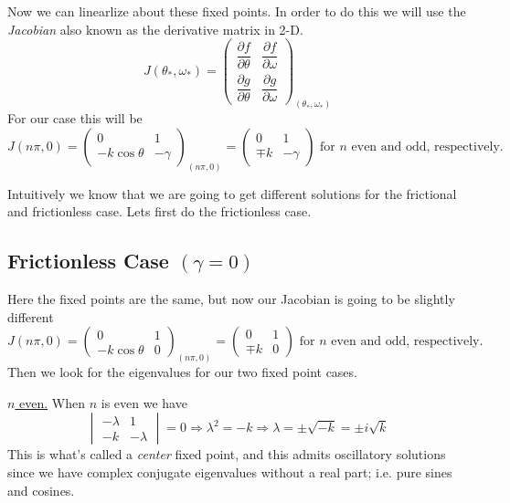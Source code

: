 \documentclass[reqno]{amsart}
\theoremstyle{definition}
\begin{document}
%
Now we can linearlize about these fixed points.  In order to do this we will use the \emph{Jacobian}
also known as the derivative matrix in 2-D.
%
\begin{equation}
J(\theta_*,\omega_*) = \begin{pmatrix}
\dfrac{\partial f}{\partial\theta} & \dfrac{\partial f}{\partial \omega}\\
\dfrac{\partial g}{\partial \theta} & \dfrac{\partial g}{\partial \omega}
\end{pmatrix}_{(\theta_*,\omega_*)}
\end{equation}
%
For our case this will be
%
\begin{equation}
J(n\pi,0) = \begin{pmatrix}
0 & 1\\
-k\cos\theta & -\gamma
\end{pmatrix}_{(n\pi,0)} = \begin{pmatrix}
0 & 1\\
\mp k & -\gamma
\end{pmatrix} \text{  for $n$ even and odd, respectively.}
\label{Eq: Jacobian}
\end{equation}
%

Intuitively we know that we are going to get different solutions for the frictional and frictionless case.
Lets first do the frictionless case.

\subsection*{Frictionless Case $(\gamma = 0)$}  Here the fixed points are the same, but now
our Jacobian is going to be slightly different
%
\begin{equation}
J(n\pi,0) = \begin{pmatrix}
0 & 1\\
-k\cos\theta & 0
\end{pmatrix}_{(n\pi,0)} = \begin{pmatrix}
0 & 1\\
\mp k & 0
\end{pmatrix} \text{  for $n$ even and odd, respectively.}
\end{equation}
%
Then we look for the eigenvalues for our two fixed point cases.

\underline{\Large $n$ even.}  When $n$ is even we have
%
\begin{equation}
\begin{vmatrix}
-\lambda & 1\\
-k & -\lambda
\end{vmatrix} = 0 \Rightarrow \lambda^2 = -k \Rightarrow \lambda = \pm\sqrt{-k} = \pm i\sqrt{k}
\end{equation}
%
This is what's called a \emph{center} fixed point, and this admits oscillatory solutions since we have
complex conjugate eigenvalues without a real part; i.e. pure sines and cosines.
\end{document}
